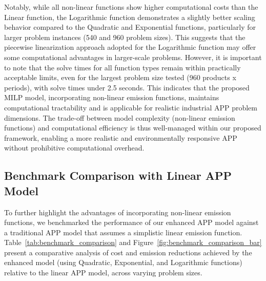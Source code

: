 \begin{table}[htbp]
\begin{table}[htbp]
Notably, while all non-linear functions show higher computational costs than the Linear function, the Logarithmic function demonstrates a slightly better scaling behavior compared to the Quadratic and Exponential functions, particularly for larger problem instances (540 and 960 problem sizes).  This suggests that the piecewise linearization approach adopted for the Logarithmic function may offer some computational advantages in larger-scale problems.  However, it is important to note that the solve times for all function types remain within practically acceptable limits, even for the largest problem size tested (960 products x periods), with solve times under 2.5 seconds.  This indicates that the proposed MILP model, incorporating non-linear emission functions, maintains computational tractability and is applicable for realistic industrial APP problem dimensions.  The trade-off between model complexity (non-linear emission functions) and computational efficiency is thus well-managed within our proposed framework, enabling a more realistic and environmentally responsive APP without prohibitive computational overhead.

\subsection{Benchmark Comparison with Linear APP Model}
\label{subsec:benchmark_comparison}
To further highlight the advantages of incorporating non-linear emission functions, we benchmarked the performance of our enhanced APP model against a traditional APP model that assumes a simplistic linear emission function. Table~\ref{tab:benchmark_comparison} and Figure~\ref{fig:benchmark_comparison_bar} present a comparative analysis of cost and emission reductions achieved by the enhanced model (using Quadratic, Exponential, and Logarithmic functions) relative to the linear APP model, across varying problem sizes.


\end{table}
\end{table}
